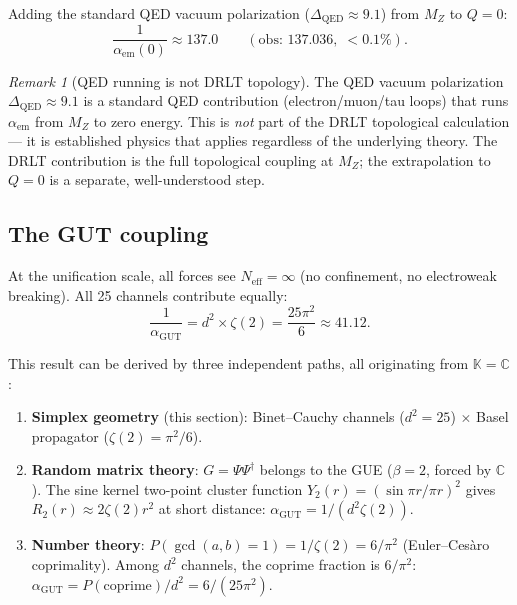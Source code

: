 \documentclass[12pt]{article}
\theoremstyle{remark}
\newtheorem{remark}[theorem]{Remark}
\theoremstyle{definition}
\begin{document}
Adding the standard QED vacuum polarization ($\Delta_\text{QED} \approx 9.1$) from $M_Z$ to $Q = 0$:
\begin{equation}
\frac{1}{\alpha_\text{em}(0)} \approx 137.0 \qquad (\text{obs: } 137.036,\; <0.1\%).
\end{equation}

\begin{remark}[QED running is not DRLT topology]
The QED vacuum polarization $\Delta_\text{QED} \approx 9.1$ is a standard QED contribution (electron/muon/tau loops) that runs $\alpha_\text{em}$ from $M_Z$ to zero energy. This is \emph{not} part of the DRLT topological calculation --- it is established physics that applies regardless of the underlying theory. The DRLT contribution is the full topological coupling at $M_Z$; the extrapolation to $Q = 0$ is a separate, well-understood step.
\end{remark}

\subsection{The GUT coupling}

At the unification scale, all forces see $N_\text{eff} = \infty$ (no confinement, no electroweak breaking). All 25 channels contribute equally:
\begin{equation}
\boxed{\frac{1}{\alpha_\text{GUT}} = d^2 \times \zeta(2) = \frac{25\pi^2}{6} \approx 41.12.}
\end{equation}

This result can be derived by three independent paths, all originating from $\mathbb{K} = \mathbb{C}$:

\begin{enumerate}
\item \textbf{Simplex geometry} (this section): Binet--Cauchy channels ($d^2 = 25$) $\times$ Basel propagator ($\zeta(2) = \pi^2/6$).

\item \textbf{Random matrix theory}: $G = \Psi\Psi^\dagger$ belongs to the GUE ($\beta = 2$, forced by $\mathbb{C}$). The sine kernel two-point cluster function $Y_2(r) = (\sin\pi r/\pi r)^2$ gives $R_2(r) \approx 2\zeta(2)r^2$ at short distance: $\alpha_\text{GUT} = 1/(d^2 \zeta(2))$.

\item \textbf{Number theory}: $P(\gcd(a,b) = 1) = 1/\zeta(2) = 6/\pi^2$ (Euler--Ces\`aro coprimality). Among $d^2$ channels, the coprime fraction is $6/\pi^2$: $\alpha_\text{GUT} = P(\text{coprime})/d^2 = 6/(25\pi^2)$.
\end{enumerate}
\end{document}
